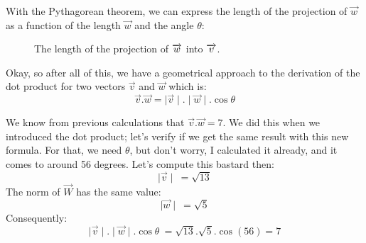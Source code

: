 \documentclass[600paper, 11pt,twoside,openany]{kdp}
\begin{document}
With the Pythagorean theorem, we can express the length of the projection of $\overrightarrow{w}$ as a function of the length $\overrightarrow{w}$ and the angle $\theta$:
\begin{figure}[!htbp]
\begin{center}
\end{center}
\vspace*{5pt}
\caption{The length of the projection of $\protect\overrightarrow{w}$ into $\protect\overrightarrow{v}$.}\label{fig:projec}
\end{figure}
\par 
\vspace{-3pt}
\indent Okay, so after all of this, we have a geometrical approach to the derivation of the dot product for two vectors $\overrightarrow{v}$ and $\overrightarrow{w}$ which is:
\[ \overrightarrow{v}.\overrightarrow{w} = \mid \overrightarrow{v} \mid.\mid \overrightarrow{w}\mid.\cos\theta\]
\par 
\vspace{-3pt}
\indent We know from previous calculations that $\overrightarrow{v}.\overrightarrow{w}=7$. We did this when we introduced the dot product; let’s verify if we get the same result with this new formula. For that, we need $\theta$, but don’t worry, I calculated it already, and it comes to around 56 degrees. Let’s compute this bastard then:
\[\mid \overrightarrow{v} \mid\ = \sqrt{13}\]
\indent The norm of $\overrightarrow{W}$ has the same value:
\[\mid \overrightarrow{w} \mid\ = \sqrt{5}\]
\indent Consequently:
\[\mid \overrightarrow{v} \mid.\mid \overrightarrow{w}\mid.\cos\theta\ = \sqrt{13}.\sqrt{5}.\cos(56) = 7 \]
\end{document}
